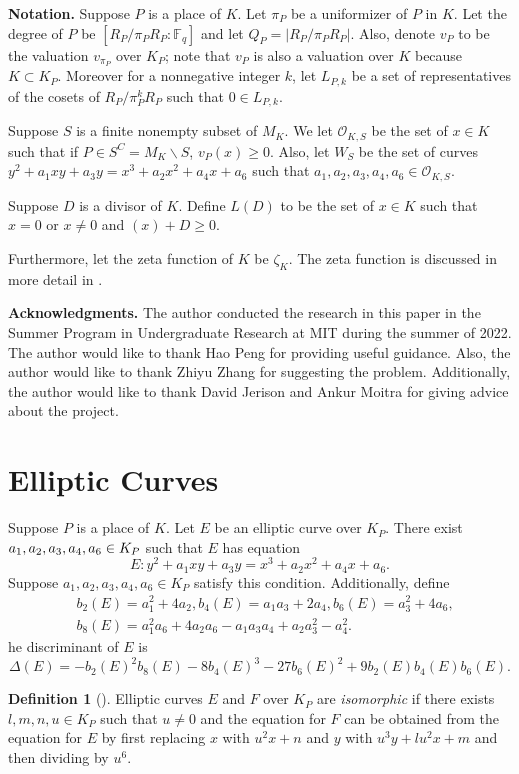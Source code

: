 \documentclass[12pt,letterpaper]{amsart}
\theoremstyle{definition}
\newtheorem{definition}[theorem]{Definition}
\begin{document}
\textbf{Notation.} 
Suppose $P$ is a place of $K$. Let $\pi_P$ be a uniformizer of $P$ in $K$.  Let the degree of $P$ be $[R_P/\pi_P R_P:\mathbb{F}_q]$ and let $Q_P=|R_P/\pi_P R_P|$. Also, denote $v_P$ to be the valuation $v_{\pi_P}$ over $K_P$; note that $v_P$ is also a valuation over $K$ because $K\subset K_P$. Moreover for a nonnegative integer $k$, let $L_{P,k}$ be a set of representatives of the cosets of $R_P/\pi_P^kR_P$ such that $0\in L_{P,k}$.

Suppose $S$ is a finite nonempty subset of $M_K$. We let $\mathcal{O}_{K,S}$ be the set of $x\in K$ such that if $P\in S^C=M_K\backslash S$, $v_P(x)\geq 0$. Also, let $W_S$ be the set of curves $y^2+a_1xy+a_3y=x^3+a_2x^2+a_4x+a_6$ such that $a_1,a_2,a_3,a_4,a_6\in\mathcal{O}_{K,S}$.

Suppose $D$ is a divisor of $K$. Define $L(D)$ to be the set of $x\in K$ such that $x=0$ or $x\not=0$ and $(x)+D\geq 0$.

Furthermore, let the zeta function of $K$ be $\zeta_K$. The zeta function is discussed in more detail in .

\textbf{Acknowledgments.} The author conducted the research in this paper in the Summer Program in Undergraduate Research at MIT during the summer of 2022. The author would like to thank Hao Peng for providing useful guidance. Also, the author would like to thank Zhiyu Zhang for suggesting the problem. Additionally, the author would like to thank David Jerison and Ankur Moitra for giving advice about the project.

\section{Elliptic Curves}
\label{sec:ec}

Suppose $P$ is a place of $K$. Let $E$ be an elliptic curve over $K_P$. There exist $a_1,a_2,a_3,a_4,\\a_6\in K_P$ such that $E$ has equation
\[
E: y^2+a_1xy+a_3y=x^3+a_2x^2+a_4x+a_6.
\]
Suppose $a_1,a_2,a_3,a_4,a_6\in K_P$ satisfy this condition. Additionally, define 
\begin{align*}
    & b_2(E)=a_1^2+4a_2, b_4(E)=a_1a_3+2a_4, b_6(E)=a_3^2+4a_6, \\
    & b_8(E)=a_1^2a_6+4a_2a_6-a_1a_3a_4+a_2a_3^2-a_4^2.
\end{align*}
he discriminant of $E$ is
\[
\Delta(E)=-b_2(E)^2b_8(E)-8b_4(E)^3-27b_6(E)^2+9b_2(E)b_4(E)b_6(E).
\]

\begin{definition}[\cite{TateAlgorithm}] Elliptic curves $E$ and $F$ over $K_P$ are \textit{isomorphic} if there exists $l,m,n,u\in K_P$ such that $u\not=0$ and the equation for $F$ can be obtained from the equation for $E$ by first replacing $x$ with $u^2x+n$ and $y$ with $u^3y+lu^2x+m$ and then dividing by $u^6$. 
\end{definition}
\end{document}
